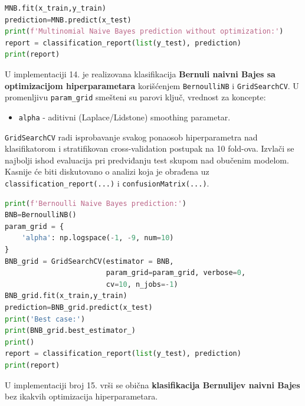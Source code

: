 \documentclass[fontsize=12bp, paper=a4]{scrarticle}
\begin{document}
\begin{lstlisting}[language=Python, caption=Multinomijalni naivni Bajes bez ikakvih optimizacija hiperparametara.]
MNB.fit(x_train,y_train)
prediction=MNB.predict(x_test)
print(f'Multinomial Naive Bayes prediction without optimization:')
report = classification_report(list(y_test), prediction)
print(report)
\end{lstlisting}
U implementaciji 14. je realizovana klasifikacija \textbf{Bernuli naivni Bajes sa optimizacijom hiperparametara} korišćenjem \verb|BernoulliNB|\cite{BNB} i \verb|GridSearchCV|. U promenljivu \verb|param_grid| smešteni su parovi ključ, vrednost za koncepte:
\begin{itemize}
    \item \verb|alpha| - aditivni (Laplace/Lidstone) smoothing parametar.
\end{itemize} 
\verb*|GridSearchCV| radi isprobavanje svakog ponaosob hiperparametra nad klasifikatorom i stratifikovan cross-validation postupak na 10 fold-ova. Izvlači se najbolji ishod evaluacija pri predviđanju test skupom nad obučenim modelom. Kasnije će biti diskutovano o analizi koja je obrađena uz \verb|classification_report(...)| i \verb|confusionMatrix(...)|.
\begin{lstlisting}[language=Python, caption=Bernulijev naivni Bajes sa optimizacijama hiperparametara.]
print(f'Bernoulli Naive Bayes prediction:')
BNB=BernoulliNB()
param_grid = {
    'alpha': np.logspace(-1, -9, num=10)
}
BNB_grid = GridSearchCV(estimator = BNB,
						param_grid=param_grid, verbose=0, 											
                        cv=10, n_jobs=-1)
BNB_grid.fit(x_train,y_train)
prediction=BNB_grid.predict(x_test)
print('Best case:')
print(BNB_grid.best_estimator_)
print()
report = classification_report(list(y_test), prediction)
print(report)
\end{lstlisting}
U implementaciji broj 15. vrši se obična \textbf{klasifikacija Bernulijev naivni Bajes } bez ikakvih optimizacija hiperparametara.
\end{document}
